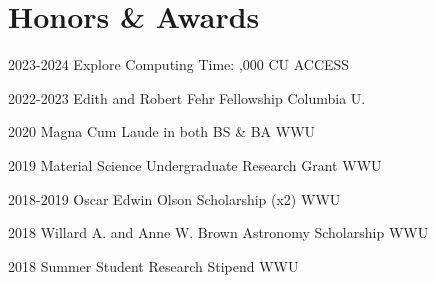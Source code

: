 \documentclass[]{scoggins-cv} %
\begin{document}
\vspace{-0.5cm}
\section{Honors \& Awards}

\begin{entrylist}

    \entry
    {2023-2024}
	{Explore Computing Time: {,000 CU}}
    {ACCESS}
    {%
        \vspace*{-1.1em}
    }

    \entry
    {2022-2023}
    {Edith and Robert Fehr Fellowship}
    {Columbia U.}
    {%
        \vspace*{-1.1em}
    }

    \entry
    {2020}
    {Magna Cum Laude in both BS \& BA}
    {WWU}
    {%
        \vspace*{-1.1em}
    }

    \entry
    {2019}
    {Material Science Undergraduate Research Grant}
    {WWU}
    {%
        \vspace*{-1.1em}
    }

    \entry
    {2018-2019}
    {Oscar Edwin Olson Scholarship (x2)} %
    {WWU}
    {%
        \vspace*{-1.1em}
    }

    \entry
    {2018}
    {Willard A. and Anne W. Brown Astronomy Scholarship} %
    {WWU}
    {%
        \vspace*{-1.1em}
    }

    \entry
    {2018}
    {Summer Student Research Stipend} %
    {WWU}
    {%
        \vspace*{-1.1em}
    }

\end{entrylist}
\iffalse
\aside{References}{0.0325}{
}
\fi
\end{document}

